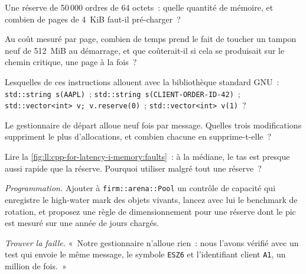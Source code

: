 \begin{exercise}[$\star$]\label{exo:ll:cpp-for-latency-i-memory:2}
Une réserve de 50\,000 ordres de 64 octets~: quelle quantité de mémoire, et combien de pages de 4~KiB faut-il pré-charger~?
\end{exercise}

\begin{exercise}[$\star$]\label{exo:ll:cpp-for-latency-i-memory:3}
Au coût mesuré par page, combien de temps prend le fait de toucher un tampon neuf de 512~MiB au démarrage, et que coûterait-il si
cela se produisait sur le chemin critique, une page à la fois~?
\end{exercise}

\begin{exercise}[$\star\star$]\label{exo:ll:cpp-for-latency-i-memory:4}
Lesquelles de ces instructions allouent avec la bibliothèque standard GNU~: \texttt{std::string s(\textquotedbl{}AAPL\textquotedbl{})}~;
\texttt{std::string s(\textquotedbl{}CLIENT-ORDER-ID-42\textquotedbl{})}~; \texttt{std::vector<int> v; v.reserve(0)}~;
\texttt{std::vector<int> v(1)}~?
\end{exercise}

\begin{exercise}[$\star\star$]\label{exo:ll:cpp-for-latency-i-memory:5}
Le gestionnaire de départ alloue neuf fois par message. Quelles trois modifications suppriment le plus d'allocations, et combien chacune
en supprime-t-elle~?
\end{exercise}

\begin{exercise}[$\star\star$]\label{exo:ll:cpp-for-latency-i-memory:6}
Lire la \cref{fig:ll:cpp-for-latency-i-memory:faults}~: à la médiane, le tas est presque aussi rapide que la réserve. Pourquoi
utiliser malgré tout une réserve~?
\end{exercise}

\begin{exercise}[$\star\star\star$]\label{exo:ll:cpp-for-latency-i-memory:7}
\emph{Programmation.} Ajouter à \texttt{firm::arena::Pool} un contrôle de capacité qui enregistre le high-water mark des objets vivants, lancez avec lui le
benchmark de rotation, et proposez une règle de dimensionnement pour une réserve dont le pic est mesuré sur une année de jours chargés.
\end{exercise}

\begin{exercise}[$\star\star\star$]\label{exo:ll:cpp-for-latency-i-memory:8}
\emph{Trouver la faille.} «~Notre gestionnaire n'alloue rien~: nous l'avons vérifié avec un test qui envoie le même message, le symbole
\texttt{ESZ6} et l'identifiant client \texttt{A1}, un million de fois.~»
\end{exercise}

